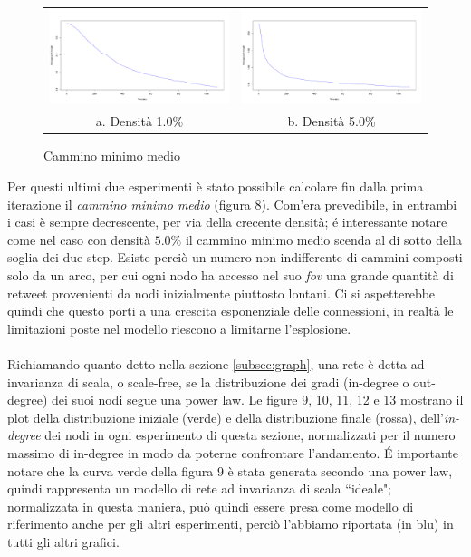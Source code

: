\documentclass[a4paper,12pt]{article}
\begin{document}
\begin{figure}[H]
\begin{tabular}{cc}
  \includegraphics[width=81mm]{images/spath_1000_rnd_1080_1_0.pdf} &   \includegraphics[width=81mm]{images/spath_1000_rnd_1080_5_0.pdf} \\
a. Densità 1.0\% & b. Densità 5.0\% \\[6pt]
\end{tabular}
\centering
\caption{Cammino minimo medio}
\end{figure}
Per questi ultimi due esperimenti è stato possibile calcolare fin dalla prima iterazione il \textit{cammino minimo medio} (figura 8). Com'era prevedibile, in entrambi i casi è sempre decrescente, per via della crecente densità; é interessante notare come nel caso con densità $5.0\%$ il cammino minimo medio scenda al di sotto della soglia dei due step. Esiste perciò un numero non indifferente di cammini composti solo da un arco, per cui ogni nodo ha accesso nel suo \textit{fov} una grande quantità di retweet provenienti da nodi inizialmente piuttosto lontani. Ci si aspetterebbe quindi che questo porti a una crescita esponenziale delle connessioni, in realtà le limitazioni poste nel modello riescono a limitarne l'esplosione. \\ \\
Richiamando quanto detto nella sezione \ref{subsec:graph}, una rete è detta ad invarianza di scala, o scale-free, se la distribuzione dei gradi (in-degree o out-degree) dei suoi nodi segue una power law. Le figure 9, 10, 11, 12 e 13 mostrano il plot della distribuzione iniziale (verde) e della distribuzione finale (rossa), dell'\textit{in-degree} dei nodi in ogni esperimento di questa sezione, normalizzati per il numero massimo di in-degree in modo da poterne confrontare l'andamento. \'E importante notare che la curva verde della figura 9 è stata generata secondo una power law, quindi rappresenta un modello di rete ad invarianza di scala ``ideale"; normalizzata in questa maniera, può quindi essere presa come modello di riferimento anche per gli altri esperimenti, perciò l'abbiamo riportata (in blu) in tutti gli altri grafici. \\ \\
\end{document}
